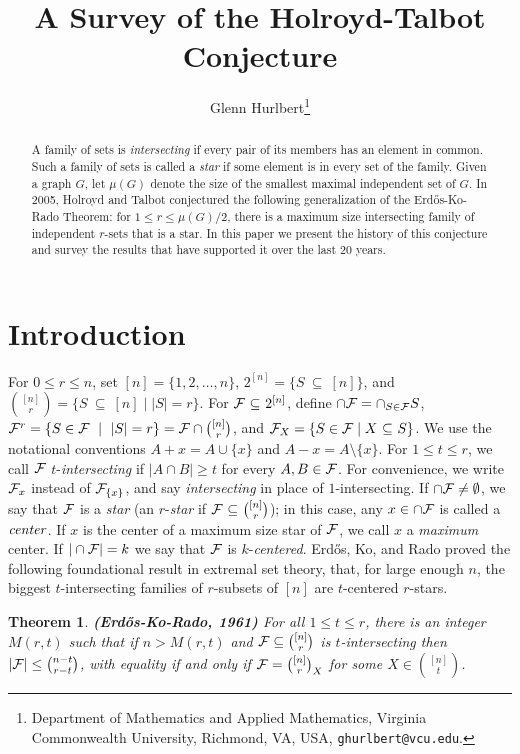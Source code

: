 \documentclass{article}
\author{
Glenn Hurlbert\thanks{
Department of Mathematics and Applied Mathematics,
Virginia Commonwealth University, 
Richmond, VA, USA, 
\texttt{ghurlbert@vcu.edu}.}
}
\title{A Survey of the Holroyd-Talbot Conjecture}
\date{}
\newtheorem{thm}{Theorem}%
\def\m{{\mu}}
\def\cF{{\cal F}}
\def\sse{{\subseteq}}
\begin{document}
\maketitle

\begin{abstract}
A family of sets is \textit{intersecting} if every pair of its members has an element in common.
Such a family of sets is called a \textit{star} if some element is in every set of the family.
Given a graph $G$, let $\m(G)$ denote the size of the smallest maximal independent set of $G$.
In 2005, Holroyd and Talbot conjectured the following generalization of the Erd\H os-Ko-Rado Theorem: for $1\le r\le \m(G)/2$, there is a maximum size intersecting family of independent $r$-sets that is a star.
In this paper we present the history of this conjecture and survey the results that have supported it over the last 20 years.
\end{abstract}



\section{Introduction}
\label{s:Intro}

For $0\le r\le n$, set $[n]=\{1,2,\ldots,n\}$, $2^{[n]}=\{S\ \sse\ [n]\}$, and $\binom{[n]}{r} = \{S\ \sse\ [n]\mid |S|=r\}$. 
For $\cF\ \sse\ 2^{[n]}$, define $\cap\cF=\cap_{S\in\cF}S$, $\cF^r=\{S\in\cF\ \mid\ |S|=r\} = \cF\cap\binom{[n]}{r}$, and $\cF_X=\{S\in\cF\mid X\ \sse\ S\}$.
We use the notational conventions $A+x=A\cup\{x\}$ and $A-x=A\setminus\{x\}$.
For $1\le t\le r$, we call $\cF$ $t$-{\it intersecting} if $|A\cap B|\ge t$ for every $A,B\in\cF$.
For convenience, we write $\cF_x$ instead of $\cF_{\{x\}}$, and say {\it intersecting} in place of $1$-intersecting.
If $\cap\cF\not=\emptyset$, we say that $\cF$ is a {\it star} (an $r$-{\it star} if $\cF\ \sse\ \binom{[n]}{r}$); in this case, any $x\in\cap\cF$ is called a ${\it center}$.
If $x$ is the center of a maximum size star of $\cF$, we call $x$ a {\it maximum} center.
If $|\cap\cF|=k$ we say that $\cF$ is $k$-{\it centered}.
Erd\H{o}s, Ko, and Rado \cite{ErdKoRad} proved the following foundational result in extremal set theory, that, for large enough $n$, the biggest $t$-intersecting families of $r$-subsets of $[n]$ are $t$-centered $r$-stars.

\begin{thm}%
\label{t:EKR}
{\bf (Erd\H os-Ko-Rado, 1961)}
For all $1\le t\le r$, there is an integer $M(r,t)$ such that if $n>M(r,t)$ and $\cF\subseteq \binom{[n]}{r}$ is $t$-intersecting then $|\cF|\leq \binom{n-t}{r-t}$, with equality if and only if $\cF=\binom{[n]}{r}_X$ for some $X\in\binom{[n]}{t}$.
\end{thm}
\end{document}
